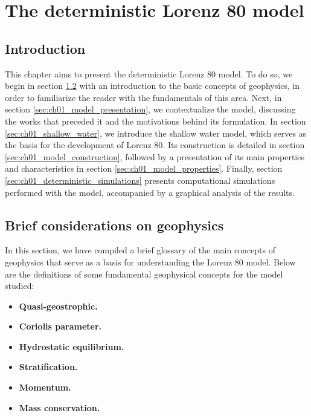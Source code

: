 \chapter{The deterministic Lorenz 80 model} \label{cap:ch01_lorenz_deterministic}
\section{Introduction} \label{sec:ch01_introduction}
This chapter aims to present the deterministic Lorenz 80 model. To do so, we begin in section \ref{sec:ch01_geophysics} with an introduction to the basic concepts of geophysics, in order to familiarize the reader with the fundamentals of this area. Next, in section \ref{sec:ch01_model_presentation}, we contextualize the model, discussing the works that preceded it and the motivations behind its formulation.
In section \ref{sec:ch01_shallow_water}, we introduce the shallow water model, which serves as the basis for the development of Lorenz 80. Its construction is detailed in section \ref{sec:ch01_model_construction}, followed by a presentation of its main properties and characteristics in section \ref{sec:ch01_model_properties}. Finally, section \ref{sec:ch01_deterministic_simulations} presents computational simulations performed with the model, accompanied by a graphical analysis of the results.
\section{Brief considerations on geophysics} \label{sec:ch01_geophysics}
In this section, we have compiled a brief glossary of the main concepts of geophysics that serve as a basis for understanding the Lorenz 80 model. Below are the definitions of some fundamental geophysical concepts for the model studied:
\begin{itemize}
    \item \textbf{Quasi-geostrophic.}
    
\item \textbf{Coriolis parameter.}
    \item \textbf{Hydrostatic equilibrium.}
\item \textbf{Stratification.}
\item \textbf{Momentum.}
\item \textbf{Mass conservation.}
\end{itemize}
